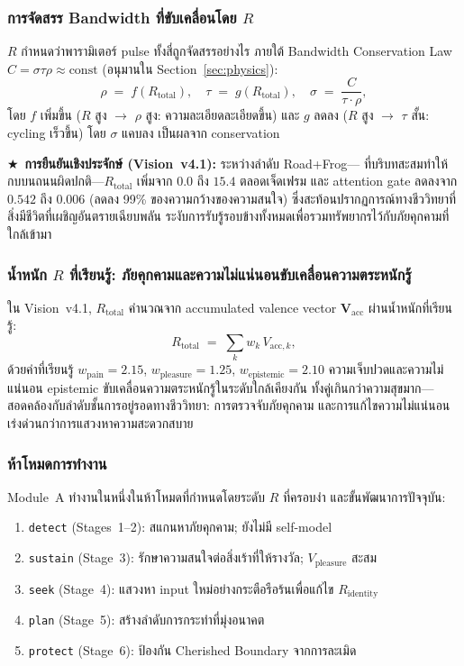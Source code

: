 \documentclass[12pt,a4paper]{article}
\newcommand{\Rtot}{R_{\mathrm{total}}}
\newcommand{\Rid}{R_{\mathrm{identity}}}
\newcommand{\Vacc}{\mathbf{V}_{\mathrm{acc}}}
\newcommand{\vpleasure}{V_{\mathrm{pleasure}}}
\newcommand{\starred}{\textbf{\textcolor{pbtblue}{$\bigstar$}}~}
\begin{document}
\subsubsection{การจัดสรร Bandwidth ที่ขับเคลื่อนโดย $R$}

$R$ กำหนดว่าพารามิเตอร์ pulse ทั้งสี่ถูกจัดสรรอย่างไร
ภายใต้ Bandwidth Conservation Law $C = \sigma\tau\rho\approx\mathrm{const}$
(อนุมานใน Section~\ref{sec:physics}):
\begin{equation}
  \rho \;=\; f(\Rtot),\quad
  \tau \;=\; g(\Rtot),\quad
  \sigma \;=\; \frac{C}{\tau\cdot\rho},
  \label{eq:bandwidth_alloc}
\end{equation}
โดย $f$ เพิ่มขึ้น ($R$ สูง $\to$ $\rho$ สูง: ความละเอียดละเอียดขึ้น) และ $g$
ลดลง ($R$ สูง $\to$ $\tau$ สั้น: cycling เร็วขึ้น) โดย $\sigma$ แคบลง
เป็นผลจาก conservation

\starred\textbf{การยืนยันเชิงประจักษ์ (Vision~v4.1):} ระหว่างลำดับ Road+Frog---
ที่บริบทสะสมทำให้กบบนถนนผิดปกติ---$\Rtot$ เพิ่มจาก $0.0$ ถึง $15.4$
ตลอดเจ็ดเฟรม และ attention gate ลดลงจาก $0.542$ ถึง $0.006$
(ลดลง 99\% ของความกว้างของความสนใจ)
ซึ่งสะท้อนปรากฏการณ์ทางชีววิทยาที่สิ่งมีชีวิตที่เผชิญอันตรายเฉียบพลัน
ระงับการรับรู้รอบข้างทั้งหมดเพื่อรวมทรัพยากรไว้กับภัยคุกคามที่ใกล้เข้ามา

\subsubsection{น้ำหนัก $R$ ที่เรียนรู้: ภัยคุกคามและความไม่แน่นอนขับเคลื่อนความตระหนักรู้}

ใน Vision~v4.1, $\Rtot$ คำนวณจาก accumulated valence vector
$\Vacc$ ผ่านน้ำหนักที่เรียนรู้:
\begin{equation}
  \Rtot \;=\; \sum_k w_k\,V_{\mathrm{acc},k},
\end{equation}
ด้วยค่าที่เรียนรู้ $w_{\mathrm{pain}} = 2.15$, $w_{\mathrm{pleasure}} = 1.25$,
$w_{\mathrm{epistemic}} = 2.10$ ความเจ็บปวดและความไม่แน่นอน epistemic
ขับเคลื่อนความตระหนักรู้ในระดับใกล้เคียงกัน ทั้งคู่เกินกว่าความสุขมาก---
สอดคล้องกับลำดับชั้นการอยู่รอดทางชีววิทยา: การตรวจจับภัยคุกคาม
และการแก้ไขความไม่แน่นอนเร่งด่วนกว่าการแสวงหาความสะดวกสบาย

\subsubsection{ห้าโหมดการทำงาน}

Module~A ทำงานในหนึ่งในห้าโหมดที่กำหนดโดยระดับ $R$ ที่ครอบงำ
และขั้นพัฒนาการปัจจุบัน:
\begin{enumerate}[leftmargin=1.8em]
  \item \texttt{detect} (Stages~1--2): สแกนหาภัยคุกคาม; ยังไม่มี self-model
  \item \texttt{sustain} (Stage~3): รักษาความสนใจต่อสิ่งเร้าที่ให้รางวัล;
    $\vpleasure$ สะสม
  \item \texttt{seek} (Stage~4): แสวงหา input ใหม่อย่างกระตือรือร้นเพื่อแก้ไข $\Rid$
  \item \texttt{plan} (Stage~5): สร้างลำดับการกระทำที่มุ่งอนาคต
  \item \texttt{protect} (Stage~6): ป้องกัน Cherished Boundary จากการละเมิด
\end{enumerate}
\end{document}
